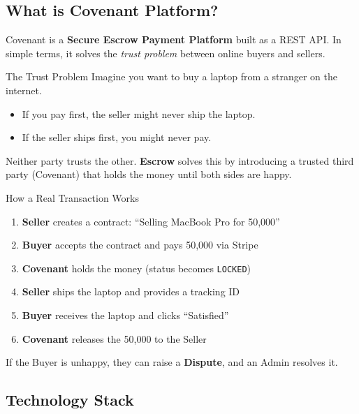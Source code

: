 \documentclass[11pt, a4paper]{article}
\begin{document}
\subsection{What is Covenant Platform?}

Covenant is a \textbf{Secure Escrow Payment Platform} built as a REST API. In simple terms, it solves the \textit{trust problem} between online buyers and sellers.

\begin{conceptbox}{The Trust Problem}
Imagine you want to buy a laptop from a stranger on the internet.
\begin{itemize}
    \item If you pay first, the seller might never ship the laptop.
    \item If the seller ships first, you might never pay.
\end{itemize}
Neither party trusts the other. \textbf{Escrow} solves this by introducing a trusted third party (Covenant) that holds the money until both sides are happy.
\end{conceptbox}

\begin{examplebox}{How a Real Transaction Works}
\begin{enumerate}
    \item \textbf{Seller} creates a contract: ``Selling MacBook Pro for \rupee{}50,000''
    \item \textbf{Buyer} accepts the contract and pays \rupee{}50,000 via Stripe
    \item \textbf{Covenant} holds the money (status becomes \texttt{LOCKED})
    \item \textbf{Seller} ships the laptop and provides a tracking ID
    \item \textbf{Buyer} receives the laptop and clicks ``Satisfied''
    \item \textbf{Covenant} releases the \rupee{}50,000 to the Seller
\end{enumerate}
If the Buyer is unhappy, they can raise a \textbf{Dispute}, and an Admin resolves it.
\end{examplebox}

\newcommand{\rupee}{\textrm{\textup{INR~}}}

\subsection{Technology Stack}
\end{document}
